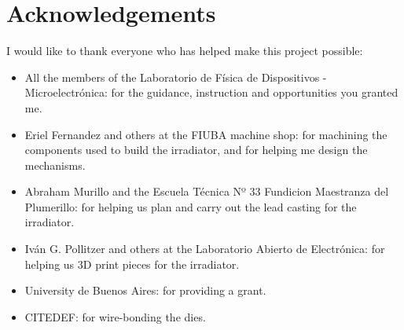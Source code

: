 \clearpage
\part*{Acknowledgements}
I would like to thank everyone who has helped make this project possible:
\begin{itemize}
    \item All the members of the Laboratorio de Física de Dispositivos - Microelectrónica: 
    for the guidance, instruction and opportunities you granted me.
    \item Eriel Fernandez and others at the FIUBA machine shop:
    for machining the components used to build the irradiator,
        and for helping me design the mechanisms.
    \item Abraham Murillo and the Escuela Técnica Nº 33 Fundicion Maestranza del 
    Plumerillo:
        for helping us plan and carry out the lead casting for the irradiator.
    \item Iván G. Pollitzer and others at the Laboratorio Abierto de Electrónica:
    for helping us 3D print pieces for the irradiator.
    \item University de Buenos Aires:
    for providing a grant.
    \item CITEDEF: for wire-bonding the dies.
\end{itemize}
\clearpage
